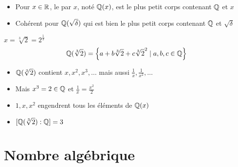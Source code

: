 \begin{frame}
\begin{itemize}
  \item Pour $x\in\mathbb{R}$, le  par $x$, noté $\mathbb{Q}(x)$, est le plus petit corps 
contenant $\mathbb{Q}$ et $x$
  \pause
  \item Cohérent pour $\mathbb{Q}(\sqrt{\delta})$ qui est bien le plus petit 
corps contenant $\mathbb{Q}$ et $\sqrt\delta$
\end{itemize}

\medskip
\pause

\begin{exemple}
  $x = \sqrt[3]{2} = 2^{\frac13}$ 
  \vspace*{-2ex}\pause
  $$\mathbb{Q}(\sqrt[3]{2}) = \left\{ a+b\sqrt[3]{2}+c\sqrt[3]{2}^2 \mid a,b,c \in \mathbb{Q} \right\}$$
  \vspace*{-4ex}\pause
  \begin{itemize}
    \item $\mathbb{Q}(\sqrt[3]{2})$ contient $x,x^2,x^3,\ldots$ mais aussi $\frac1x, \frac 1{x^2},\ldots$
    \pause
    \item Mais $x^3 = 2 \in \mathbb{Q}$ \pause et $\frac1x = \frac{x^2}{2}$
    \pause
    \item $1,x,x^2$ engendrent tous les éléments de $\mathbb{Q}(x)$
    \pause
    \item $[\mathbb{Q}(\sqrt[3]{2}):\mathbb{Q}] = 3$
  \end{itemize}
\end{exemple}

\end{frame}



\section{Nombre algébrique}

